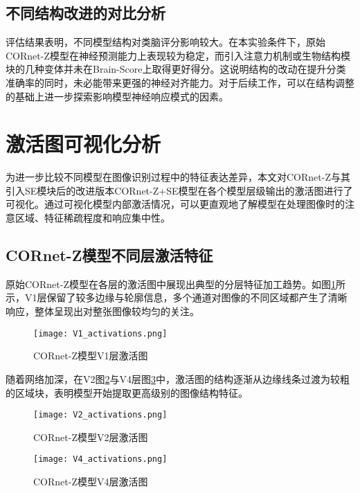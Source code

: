 \subsection{不同结构改进的对比分析}

评估结果表明，不同模型结构对类脑评分影响较大。在本实验条件下，原始CORnet-Z模型在神经预测能力上表现较为稳定，而引入注意力机制或生物结构模块的几种变体并未在Brain-Score上取得更好得分。这说明结构的改动在提升分类准确率的同时，未必能带来更强的神经对齐能力。对于后续工作，可以在结构调整的基础上进一步探索影响模型神经响应模式的因素。

\section{激活图可视化分析}

为进一步比较不同模型在图像识别过程中的特征表达差异，本文对CORnet-Z与其引入SE模块后的改进版本CORnet-Z+SE模型在各个模型层级输出的激活图进行了可视化。通过可视化模型内部激活情况，可以更直观地了解模型在处理图像时的注意区域、特征稀疏程度和响应集中性。

\subsection{CORnet-Z模型不同层激活特征}

原始CORnet-Z模型在各层的激活图中展现出典型的分层特征加工趋势。如图\ref{f.v1_act}所示，V1层保留了较多边缘与轮廓信息，多个通道对图像的不同区域都产生了清晰响应，整体呈现出对整张图像较均匀的关注。

\begin{figure}[hbt]
	\centering
	\texttt{[image: V1\_activations.png]}
	\caption{CORnet-Z模型V1层激活图}
	\label{f.v1_act}
\end{figure}

随着网络加深，在V2图\ref{f.v2_act}与V4层图\ref{f.v4_act}中，激活图的结构逐渐从边缘线条过渡为较粗的区域块，表明模型开始提取更高级别的图像结构特征。

\begin{figure}[hbt]
	\centering
	\texttt{[image: V2\_activations.png]}
	\caption{CORnet-Z模型V2层激活图}
	\label{f.v2_act}
\end{figure}

\begin{figure}[hbt]
	\centering
	\texttt{[image: V4\_activations.png]}
	\caption{CORnet-Z模型V4层激活图}
	\label{f.v4_act}
\end{figure}

